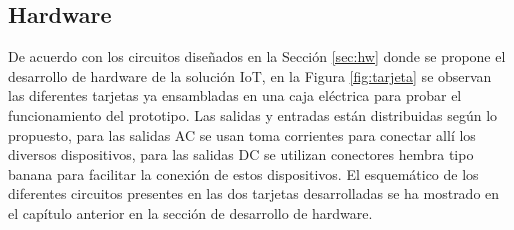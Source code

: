 %
%
%



\subsection{Hardware}

De acuerdo con los circuitos diseñados en la Sección \ref{sec:hw} donde se propone el desarrollo de hardware de la solución IoT, en la Figura \ref{fig:tarjeta} se observan las diferentes tarjetas ya ensambladas en una caja eléctrica para probar el funcionamiento del prototipo. Las salidas y entradas están distribuidas según lo propuesto, para las salidas AC se usan toma corrientes para conectar allí los diversos dispositivos, para las salidas DC se utilizan conectores hembra tipo banana para facilitar la conexión de estos dispositivos. El esquemático de los diferentes circuitos presentes en las dos tarjetas desarrolladas se ha mostrado en el capítulo anterior en la sección de desarrollo de hardware.\\

